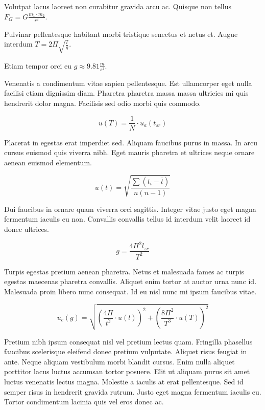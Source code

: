 \documentclass{article}
\begin{document}
Volutpat lacus laoreet non curabitur gravida arcu ac. Quisque non tellus \begin{math}
	F_{G}=G\frac{m_1\cdot m_2}{r^2}
\end{math}.\newline

Pulvinar pellentesque habitant morbi tristique senectus et netus et. Augue interdum $ T=2\Pi \sqrt{\frac{l}{g}} $.\newline

Etiam tempor orci eu \( g\approx 9.81\frac{m}{s^2} \).\newline

Venenatis a condimentum vitae sapien pellentesque. Est ullamcorper eget nulla facilisi etiam dignissim diam. Pharetra pharetra massa massa ultricies mi quis hendrerit dolor magna. Facilisis sed odio morbi quis commodo.

\[ u(T)=\frac{1}{N} \cdot u_a (t_{sr}) \]

Placerat in egestas erat imperdiet sed. Aliquam faucibus purus in massa. In arcu cursus euismod quis viverra nibh. Eget mauris pharetra et ultrices neque ornare aenean euismod elementum.

$$ u(t)=\sqrt{\frac{\sum(t_i-\overline{t})}{n(n-1)}} $$

Dui faucibus in ornare quam viverra orci sagittis. Integer vitae justo eget magna fermentum iaculis eu non. Convallis convallis tellus id interdum velit laoreet id donec ultrices. 

\begin{displaymath}
	g=\frac{4\Pi^2l_{zr}}{T^2}
\end{displaymath}

Turpis egestas pretium aenean pharetra. Netus et malesuada fames ac turpis egestas maecenas pharetra convallis. Aliquet enim tortor at auctor urna nunc id. Malesuada proin libero nunc consequat. Id eu nisl nunc mi ipsum faucibus vitae.

\begin{equation}
	u_c(g)=\sqrt{(\frac{4\Pi}{t^2}\cdot u(l))^2+(\frac{8\Pi^2}{T^3}\cdot u(T))^2}
\end{equation}

Pretium nibh ipsum consequat nisl vel pretium lectus quam. Fringilla phasellus faucibus scelerisque eleifend donec pretium vulputate. Aliquet risus feugiat in ante. Neque aliquam vestibulum morbi blandit cursus. Enim nulla aliquet porttitor lacus luctus accumsan tortor posuere. Elit ut aliquam purus sit amet luctus venenatis lectus magna. Molestie a iaculis at erat pellentesque. Sed id semper risus in hendrerit gravida rutrum. Justo eget magna fermentum iaculis eu. Tortor condimentum lacinia quis vel eros donec ac.
\end{document}
